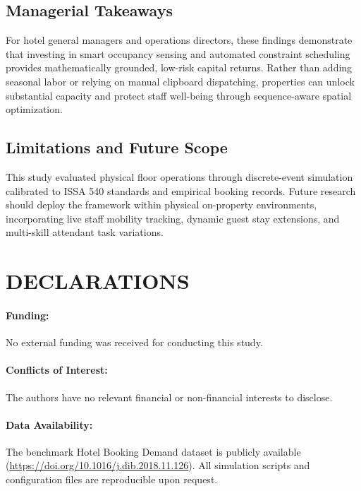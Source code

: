 \documentclass[11pt,a4paper]{article}
\begin{document}
\subsection{Managerial Takeaways}
For hotel general managers and operations directors, these findings demonstrate that investing in smart occupancy sensing and automated constraint scheduling provides mathematically grounded, low-risk capital returns. Rather than adding seasonal labor or relying on manual clipboard dispatching, properties can unlock substantial capacity and protect staff well-being through sequence-aware spatial optimization.

\subsection{Limitations and Future Scope}
This study evaluated physical floor operations through discrete-event simulation calibrated to ISSA 540 standards and empirical booking records. Future research should deploy the framework within physical on-property environments, incorporating live staff mobility tracking, dynamic guest stay extensions, and multi-skill attendant task variations.

\section*{DECLARATIONS}
\paragraph{Funding:} No external funding was received for conducting this study.
\paragraph{Conflicts of Interest:} The authors have no relevant financial or non-financial interests to disclose.
\paragraph{Data Availability:} The benchmark Hotel Booking Demand dataset \cite{antonio2019} is publicly available (\url{https://doi.org/10.1016/j.dib.2018.11.126}). All simulation scripts and configuration files are reproducible upon request.
\end{document}
